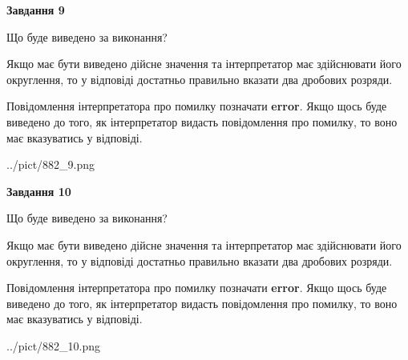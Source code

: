 \documentclass[12pt, ukrainian]{article}
\begin{document}
{\begin {Large}
{\begin {center}\textbf{Завдання 9}\end {center}}\par
Що буде виведено за виконання? \par

Якщо має бути виведено дійсне значення та інтерпретатор має здійснювати його округлення, 
то у відповіді достатньо правильно вказати два дробових розряди.

Повідомлення інтерпретатора про помилку позначати \textbf{error}.
Якщо щось буде виведено до того, як інтерпретатор видасть повідомлення про помилку, 
то воно має вказуватись у відповіді. \par

\begin{center}
	{../pict/882_9.png}
\end{center}
\newpage

{\begin {center}\textbf{Завдання 10}\end {center}}\par
Що буде виведено за виконання? \par

Якщо має бути виведено дійсне значення та інтерпретатор має здійснювати його округлення, 
то у відповіді достатньо правильно вказати два дробових розряди.

Повідомлення інтерпретатора про помилку позначати \textbf{error}.
Якщо щось буде виведено до того, як інтерпретатор видасть повідомлення про помилку, 
то воно має вказуватись у відповіді. \par

\begin{center}
	{../pict/882_10.png}
\end{center}
\newpage

\end {Large}}
\end{document}
